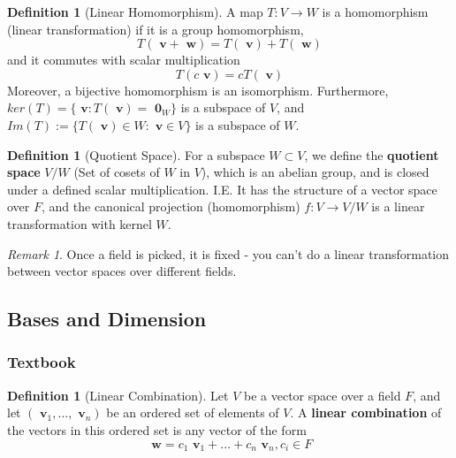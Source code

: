 \documentclass[12pt]{article}
\theoremstyle{definition}
\newtheorem{defn}[thm]{Definition}
\theoremstyle{remark}
\newtheorem{rmk}[thm]{Remark}
\numberwithin{equation}{section}
\newcommand\B[1]{\textbf{ #1}}
\begin{document}
\vspace{15pt}

\begin{defn}[Linear Homomorphism]
        A map $T: V \rightarrow W$ is a homomorphism (linear transformation) if it is a group homomorphism, \begin{equation}
                T(\B{v} + \B{w}) = T(\B{v}) + T(\B{w})
        \end{equation}
        and it commutes with scalar multiplication \begin{equation}
                T(c\B{v}) = cT(\B{v})
        \end{equation}
        Moreover, a bijective homomorphism is an isomorphism. Furthermore, $ker(T) = \{\B{v} : T(\B{v}) = \B{0}_W\}$ is a subspace of $V$, and $Im(T) := \{T(\B{v}) \in W: \B{v} \in V\}$ is a subspace of $W$.
\end{defn}

\vspace{15pt}

\begin{defn}[Quotient Space]
        For a subspace $W \subset V$, we define the \B{quotient space} $V/W$ (Set of cosets of $W$ in $V$), which is an abelian group, and is closed under a defined scalar multiplication. I.E. It has the structure of a vector space over $F$, and the canonical projection (homomorphism) $f:V \rightarrow V/W$ is a linear transformation with kernel $W$.
\end{defn}

\vspace{15pt}


\begin{rmk}
        Once a field is picked, it is fixed - you can't do a linear transformation between vector spaces over different fields.
\end{rmk}


\vspace{15pt}



\subsection{Bases and Dimension}

\subsubsection{Textbook}

\begin{defn}[Linear Combination]
        Let $V$ be a vector space over a field $F$, and let $(\B{v}_1,...,\B{v}_n)$ be an ordered set of elements of $V$. A \B{linear combination} of the vectors in this ordered set is any vector of the form \begin{equation}
                \B{w} = c_1\B{v}_1+...+c_n\B{v}_n, c_i \in F
        \end{equation}
\end{defn}
\end{document}
